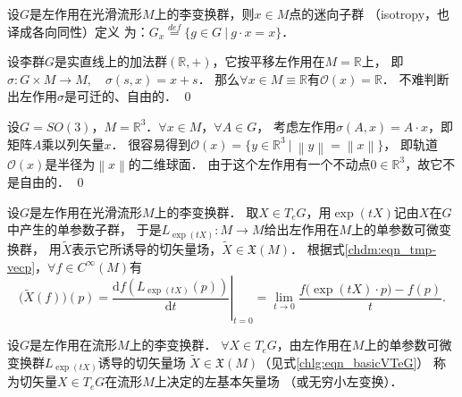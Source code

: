 
\begin{definition}\label{chlg:def_isotropy}
    设$G$是左作用在光滑流形$M$上的李变换群，则$x \in M$点的{\heiti 迷向子群}
    （isotropy，也译成{\kaishu 各向同性}）定义
    为：$G_x \overset{def}{=} \{ g\in G \ | \  g\cdot x = x \}$．
\end{definition}

\begin{example}
    设李群$G$是实直线上的加法群$(\mathbb{R},+)$，它按平移左作用在$M=\mathbb{R}$上，
    即$\sigma: G\times M \to M,\quad \sigma(s,x)=x+s$．
    那么$\forall x\in M\equiv \mathbb{R}$有$\mathcal{O}(x)=\mathbb{R}$．
    不难判断出左作用$\sigma$是可迁的、自由的． \qed
\end{example}

\begin{example}
    设$G=SO(3)$，$M=\mathbb{R}^3$．$\forall x\in M$，$\forall A\in G$，
    考虑左作用$\sigma(A,x)=A\cdot x$，即矩阵$A$乘以列矢量$x$．
    很容易得到$\mathcal{O}(x)=\{y\in \mathbb{R}^3 \ |\   \left\|y\right\|=\left\|x\right\| \}$，
    即轨道$\mathcal{O}(x)$是半径为$\left\|x\right\|$的二维球面．
    由于这个左作用有一个不动点$0\in \mathbb{R}^3$，故它不是自由的． \qed
\end{example}



设$G$是左作用在光滑流形$M$上的李变换群．
取$X \in T_e G$，用$\exp(tX)$记由$X$在$G$中产生的单参数子群，
于是$L_{\exp(tX)}: M \rightarrow M$给出左作用在$M$上的单参数可微变换群，
用$\widetilde{X}$表示它所诱导的切矢量场，$\widetilde{X} \in \mathfrak{X}(M)$．
根据式\eqref{chdm:eqn_tmp-vecp}，$\forall f \in C^{\infty}(M)$有
\begin{equation}\label{chlg:eqn_basicVTeG}
    \bigl(\widetilde{X}(f)\bigr)(p) = \left.\frac{\mathrm{d} f\left(L_{\exp(tX)}(p)\right)}{\mathrm{d} t}\right|_{t=0} 
    =\lim _{t \rightarrow 0} \frac{f\bigl(\exp(tX)\cdot p\bigr)-f(p)}{t} .
\end{equation}


\begin{definition}\label{chlg:def_left-basicV}
    设$G$是左作用在流形$M$上的李变换群．
    $\forall X \in T_e G$，由左作用在$M$上的单参数可微变换群$L_{\exp (t  X)}$诱导的切矢量场
    $\widetilde{X} \in \mathfrak{X}(M)$（见式\eqref{chlg:eqn_basicVTeG}）
    称为切矢量$X \in T_e G$在流形$M$上决定的{\heiti 左基本矢量场}
    （或{\heiti 无穷小左变换}）．
\end{definition} 


